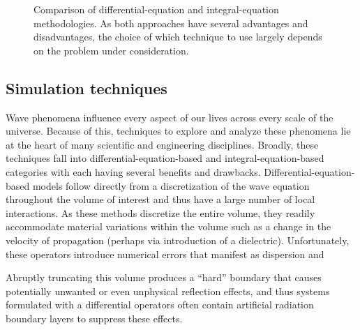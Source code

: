 \begin{figure}
  \centering
  
  \caption{\label{fig:mindmap} Comparison of differential-equation and integral-equation methodologies.
    As both approaches have several advantages and disadvantages, the choice of which technique to use largely depends on the problem under consideration.
  }
\end{figure}

\subsection{Simulation techniques}

Wave phenomena influence every aspect of our lives across every scale of the universe.
Because of this, techniques to explore and analyze these phenomena lie at the heart of many scientific and engineering disciplines.
Broadly, these techniques fall into differential-equation-based and integral-equation-based categories with each having several benefits and drawbacks.
Differential-equation-based models follow directly from a discretization of the wave equation throughout the volume of interest and thus have a large number of local interactions.
As these methods discretize the entire volume, they readily accommodate material variations within the volume such as a change in the velocity of propagation (perhaps via introduction of a dielectric).
Unfortunately, these operators introduce numerical errors that manifest as dispersion and

Abruptly truncating this volume produces a ``hard'' boundary that causes potentially unwanted or even unphysical reflection effects, and thus systems formulated with a differential operators often contain artificial radiation boundary layers to suppress these effects.

